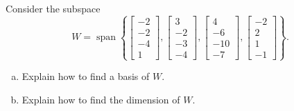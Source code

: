 
\begin{exerciseStatement}


Consider the subspace \[W=\operatorname{span}  \left\{ \left[\begin{array}{c}
-2 \\
-2 \\
-4 \\
1
\end{array}\right] , \left[\begin{array}{c}
3 \\
-2 \\
-3 \\
-4
\end{array}\right] , \left[\begin{array}{c}
4 \\
-6 \\
-10 \\
-7
\end{array}\right] , \left[\begin{array}{c}
-2 \\
2 \\
1 \\
-1
\end{array}\right] \right\} .\]


\begin{enumerate}[(a)]
\item  Explain how to find a basis of \(W\).
\item  Explain how to find the dimension of \(W\).
\end{enumerate}
    
\end{exerciseStatement}
    

